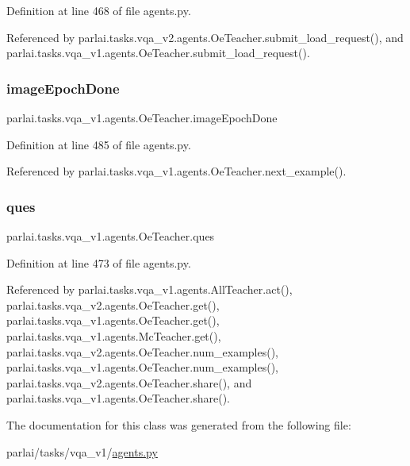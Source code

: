 Definition at line 468 of file agents.\+py.



Referenced by parlai.\+tasks.\+vqa\+\_\+v2.\+agents.\+Oe\+Teacher.\+submit\+\_\+load\+\_\+request(), and parlai.\+tasks.\+vqa\+\_\+v1.\+agents.\+Oe\+Teacher.\+submit\+\_\+load\+\_\+request().

\mbox{\label{classparlai_1_1tasks_1_1vqa__v1_1_1agents_1_1OeTeacher_a5db996acbd73e3fc6f45d69dd61fcefd}} 
\subsubsection{\texorpdfstring{image\+Epoch\+Done}{imageEpochDone}}
{\footnotesize\ttfamily parlai.\+tasks.\+vqa\+\_\+v1.\+agents.\+Oe\+Teacher.\+image\+Epoch\+Done}



Definition at line 485 of file agents.\+py.



Referenced by parlai.\+tasks.\+vqa\+\_\+v1.\+agents.\+Oe\+Teacher.\+next\+\_\+example().

\mbox{\label{classparlai_1_1tasks_1_1vqa__v1_1_1agents_1_1OeTeacher_a180c1596f72999be0858a5c9c651c93a}} 
\subsubsection{\texorpdfstring{ques}{ques}}
{\footnotesize\ttfamily parlai.\+tasks.\+vqa\+\_\+v1.\+agents.\+Oe\+Teacher.\+ques}



Definition at line 473 of file agents.\+py.



Referenced by parlai.\+tasks.\+vqa\+\_\+v1.\+agents.\+All\+Teacher.\+act(), parlai.\+tasks.\+vqa\+\_\+v2.\+agents.\+Oe\+Teacher.\+get(), parlai.\+tasks.\+vqa\+\_\+v1.\+agents.\+Oe\+Teacher.\+get(), parlai.\+tasks.\+vqa\+\_\+v1.\+agents.\+Mc\+Teacher.\+get(), parlai.\+tasks.\+vqa\+\_\+v2.\+agents.\+Oe\+Teacher.\+num\+\_\+examples(), parlai.\+tasks.\+vqa\+\_\+v1.\+agents.\+Oe\+Teacher.\+num\+\_\+examples(), parlai.\+tasks.\+vqa\+\_\+v2.\+agents.\+Oe\+Teacher.\+share(), and parlai.\+tasks.\+vqa\+\_\+v1.\+agents.\+Oe\+Teacher.\+share().



The documentation for this class was generated from the following file\+:\begin{DoxyCompactItemize}
\item 
parlai/tasks/vqa\+\_\+v1/\hyperlink{parlai_2tasks_2vqa__v1_2agents_8py}{agents.\+py}\end{DoxyCompactItemize}
